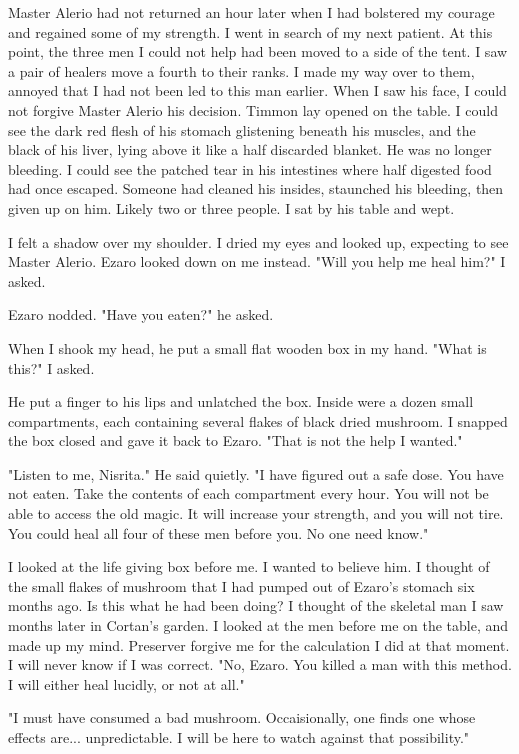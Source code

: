 \documentclass{article}
\begin{document}
Master Alerio had not returned an hour later when I had bolstered my courage and regained some of my strength. I went in search of my next patient. At this point, the three men I could not help had been moved to a side of the tent. I saw a pair of healers move a fourth to their ranks. I made my way over to them, annoyed that I had not been led to this man earlier. When I saw his face, I could not forgive Master Alerio his decision. Timmon lay opened on the table. I could see the dark red flesh of his stomach glistening beneath his muscles, and the black of his liver, lying above it like a half discarded blanket. He was no longer bleeding. I could see the patched tear in his intestines where half digested food had once escaped. Someone had cleaned his insides, staunched his bleeding, then given up on him. Likely two or three people. I sat by his table and wept. 

I felt a shadow over my shoulder. I dried my eyes and looked up, expecting to see Master Alerio. Ezaro looked down on me instead. "Will you help me heal him?" I asked. 

Ezaro nodded. "Have you eaten?" he asked. 

When I shook my head, he put a small flat wooden box in my hand. "What is this?" I asked.

He put a finger to his lips and unlatched the box. Inside were a dozen small compartments, each containing several flakes of black dried mushroom. I snapped the box closed and gave it back to Ezaro. "That is not the help I wanted."

"Listen to me, Nisrita." He said quietly. "I have figured out a safe dose. You have not eaten. Take the contents of each compartment every hour. You will not be able to access the old magic. It will increase your strength, and you will not tire. You could heal all four of these men before you. No one need know."

I looked at the life giving box before me. I wanted to believe him. I thought of the small flakes of mushroom that I had pumped out of Ezaro's stomach six months ago. Is this what he had been doing? I thought of the skeletal man I saw months later in Cortan's garden. I looked at the men before me on the table, and made up my mind. Preserver forgive me for the calculation I did at that moment. I will never know if I was correct. "No, Ezaro. You killed a man with this method. I will either heal lucidly, or not at all."

"I must have consumed a bad mushroom. Occaisionally, one finds one whose effects are... unpredictable. I will be here to watch against that possibility."
\end{document}
